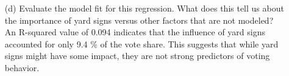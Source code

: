 \documentclass[12pt,letterpaper]{article}
\begin{document}
\begin{enumerate}
	
	
	\vspace{1cm}
	
	\item [(d)] Evaluate the model fit for this regression.  What does this	tell us about the importance of yard signs versus other factors that are not modeled?\\
	An R-squared value of 0.094 indicates that the influence of yard signs accounted for only 9.4 \% of the vote share. This suggests that while yard signs might have some impact, they are not strong predictors of voting behavior.\\
	
	
	
	
	
	
\end{enumerate}  
\end{document}
